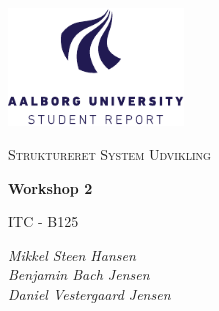 \begin{titlepage}
    \centering
	\includegraphics[width=0.35\textwidth]{Projectdoc/Assets/Illustrationer/aau_logo_en.pdf}\par\vspace{1cm}
	{\scshape\Large Struktureret System Udvikling\par}
	\vspace{0.2cm}
	{\huge\bfseries Workshop 2\par}
	\vspace{0.2cm}
	{\scshape\Large ITC - B125\par}
	\vspace{2cm}
	{\Large\itshape 
    	Mikkel Steen Hansen\\
        Benjamin Bach Jensen\\
        Daniel Vestergaard Jensen\\
    \par}
	\vfill
	\vfill
\end{titlepage}